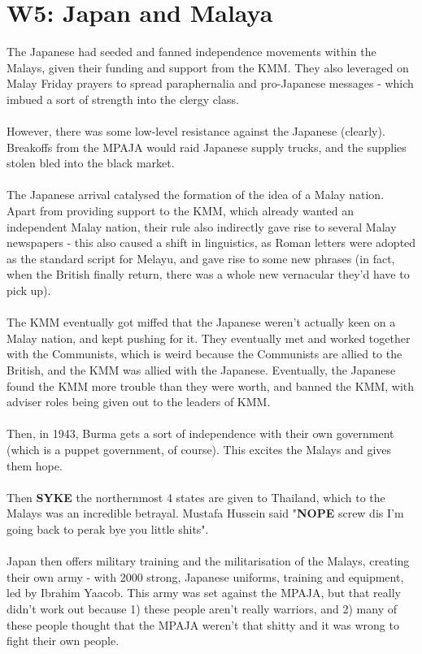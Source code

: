 \documentclass[a4paper]{article}
\begin{document}
\section{W5: Japan and Malaya}
The Japanese had seeded and fanned independence movements within the Malays, given their funding and support from the KMM. They also leveraged on Malay Friday prayers to spread paraphernalia and pro-Japanese messages - which imbued a sort of strength into the clergy class.\\
\\
However, there was some low-level resistance against the Japanese (clearly). Breakoffs from the MPAJA would raid Japanese supply trucks, and the supplies stolen bled into the black market.\\
\\
The Japanese arrival catalysed the formation of the idea of a Malay nation. Apart from providing support to the KMM, which already wanted an independent Malay nation, their rule also indirectly gave rise to several Malay newspapers - this also caused a shift in linguistics, as Roman letters were adopted as the standard script for Melayu, and gave rise to some new phrases (in fact, when the British finally return, there was a whole new vernacular they'd have to pick up).\\
\\
The KMM eventually got miffed that the Japanese weren't actually keen on a Malay nation, and kept pushing for it. They eventually met and worked together with the Communists, which is weird because the Communists are allied to the British, and the KMM was allied with the Japanese. Eventually, the Japanese found the KMM more trouble than they were worth, and banned the KMM, with adviser roles being given out to the leaders of KMM.\\
\\
Then, in 1943, Burma gets a sort of independence with their own government (which is a puppet government, of course). This excites the Malays and gives them hope.\\
\\
Then \textbf{SYKE} the northernmost 4 states are given to Thailand, which to the Malays was an incredible betrayal. Mustafa Hussein said "\textbf{NOPE} screw dis I'm going back to perak bye you little shits".\\
\\
Japan then offers military training and the militarisation of the Malays, creating their own army - with 2000 strong, Japanese uniforms, training and equipment, led by Ibrahim Yaacob. This army was set against the MPAJA, but that really didn't work out because 1) these people aren't really warriors, and 2) many of these people thought that the MPAJA weren't that shitty and it was wrong to fight their own people.\\
\end{document}
